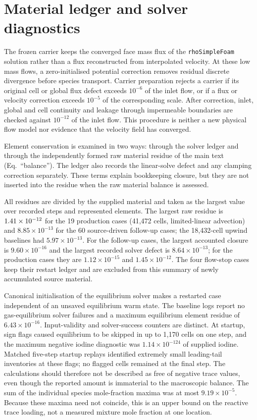 \documentclass{article}
\begin{document}
\section{Material ledger and solver diagnostics}
\label{sec:s-ledger}
The frozen carrier keeps the converged face mass flux of the
\texttt{rhoSimpleFoam} solution rather than a flux reconstructed from
interpolated velocity. At these low mass flows, a zero-initialised
potential correction removes residual discrete divergence before species
transport. Carrier preparation rejects a carrier if its original cell or
global flux defect exceeds $10^{-6}$ of the inlet flow, or if a flux or
velocity correction exceeds $10^{-5}$ of the corresponding scale. After
correction, inlet, global and cell continuity and leakage through
impermeable boundaries are checked against $10^{-12}$ of the inlet flow.
This procedure is neither a new physical flow model nor evidence that
the velocity field has converged.

Element conservation is examined in two ways: through the solver
ledger and through the independently formed raw material residue of the
main text (Eq.~``balance''). The ledger also records the linear-solve
defect and any clamping correction separately. These terms explain
bookkeeping closure, but they are not inserted into the residue when
the raw material balance is assessed.

All residues are divided by the supplied material and taken as the
largest value over recorded steps and represented elements. The largest
raw residue is $1.41\times10^{-12}$ for the 19 production cases
(41,472 cells, limited-linear advection) and $8.85\times10^{-13}$ for
the 60 source-driven follow-up cases; the 18,432-cell upwind baselines
had $5.97\times10^{-13}$. For the follow-up cases, the largest
accounted closure is $9.60\times10^{-16}$ and the largest recorded
solver defect is $8.64\times10^{-13}$; for the production cases they
are $1.12\times10^{-15}$ and $1.45\times10^{-12}$. The four flow-stop
cases keep their restart ledger and are excluded from this summary of
newly accumulated source material.

Canonical initialisation of the equilibrium solver makes a restarted
case independent of an unsaved equilibrium warm state. The baseline logs report no gas-equilibrium solver failures and a
maximum equilibrium element residue of $6.43\times10^{-16}$.
Input-validity and solver-success counters are distinct. At startup,
sign flags caused equilibrium to be skipped in up to 1,170 cells on
one step, and the maximum negative iodine diagnostic was
$1.14\times10^{-124}$ of supplied iodine. Matched five-step startup
replays identified extremely small leading-tail inventories at these
flags; no flagged cells remained at the final step. The calculations
should therefore not be described as free of negative trace values,
even though the reported amount is immaterial to the macroscopic
balance. The sum of the individual species mole-fraction maxima was at
most $9.19\times10^{-5}$. Because these maxima need not coincide, this
is an upper bound on the reactive trace loading, not a measured
mixture mole fraction at one location.
\end{document}
